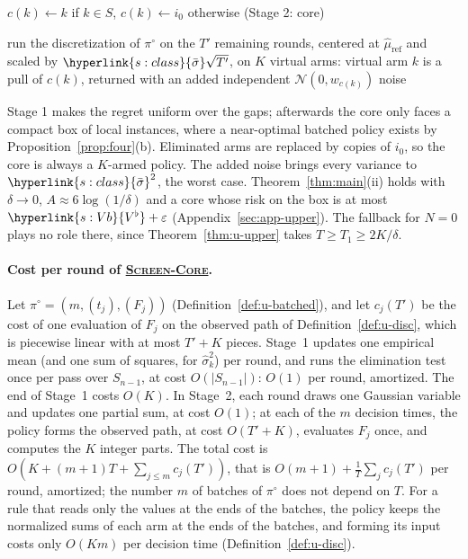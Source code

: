 \documentclass[11pt]{article}
\DeclareRobustCommand{\sy}[2]{{\hyperlink{#1}{#2}}}
\newcommand{\1}{\mathbf{1}}
\newcommand{\Cab}{\sy{s:class}{\mathcal C(a,b,\bar\sigma,\sigma_{\mathrm p})}}
\newcommand{\sbar}{\sy{s:class}{\bar\sigma}}
\newcommand{\Vb}{\sy{s:Vb}{V^\flat}}
\newcommand{\SC}{\sy{alg:sc}{\textsc{Screen-Core}}}
\begin{document}
\begin{definition}[algorithm: \textsc{Screen-Core}$(\delta,A,\pi^\circ)$ for $\Cab$]
{\begin{minipage}{0.96\linewidth}
\noindent\hspace*{0.0em}\parbox[t]{\dimexpr\linewidth-0.0em\relax}{\raggedright $c(k)\gets k$ if $k\in S$, $c(k)\gets i_0$ otherwise \hfill(Stage 2: core)}\par
\noindent\hspace*{0.0em}\parbox[t]{\dimexpr\linewidth-0.0em\relax}{\raggedright run the discretization of $\pi^\circ$ on the $T'$ remaining rounds, centered at $\hat\mu_{\mathrm{ref}}$ and scaled by $\sbar\sqrt{T'}$, on $K$ virtual arms: virtual arm $k$ is a pull of $c(k)$, returned with an added independent $\mathcal N(0,w_{c(k)})$ noise}\par
\end{minipage}}
\end{definition}


\noindent Stage 1 makes the regret uniform over the gaps; afterwards the core only faces a compact box of local instances, where a near-optimal batched policy exists by
Proposition~\ref{prop:four}(b). Eliminated arms are replaced by copies of $i_0$, so the core is always a $K$-armed policy. The added noise brings every variance to
$\sbar^2$, the worst case. Theorem~\ref{thm:main}(ii) holds with $\delta\to0$, $A\approx6\log(1/\delta)$ and a core whose risk on the box is at most $\Vb+\varepsilon$
(Appendix~\ref{sec:app-upper}). The fallback for $N=0$ plays no role there, since Theorem~\ref{thm:u-upper} takes $T\ge T_1\ge2K/\delta$.

\paragraph{Cost per round of \SC.} Let $\pi^\circ=(m,(t_j),(F_j))$ (Definition~\ref{def:u-batched}), and let $c_j(T')$ be the cost of one evaluation of $F_j$ on
the observed path of Definition~\ref{def:u-disc}, which is piecewise linear with at most $T'+K$ pieces. Stage~1 updates one empirical mean (and one sum of
squares, for $\hat\sigma_k^2$) per round, and runs the elimination test once per pass over $S_{n-1}$, at cost $O(|S_{n-1}|)$: $O(1)$ per round, amortized.
The end of Stage~1 costs $O(K)$. In Stage~2, each round draws one Gaussian variable and updates one partial sum, at cost $O(1)$; at each of the $m$
decision times, the policy forms the observed path, at cost $O(T'+K)$, evaluates $F_j$ once, and computes the $K$ integer parts. The total cost is
$O(K+(m+1)T+\sum_{j\le m}c_j(T'))$, that is $O(m+1)+\frac1T\sum_jc_j(T')$ per round, amortized; the number $m$ of batches of $\pi^\circ$ does not depend on $T$.
For a rule that reads only the values at the ends of the batches, the policy keeps the normalized sums of each arm at the ends of the batches, and forming its input costs only $O(Km)$ per decision time
(Definition~\ref{def:u-disc}).
\end{document}
